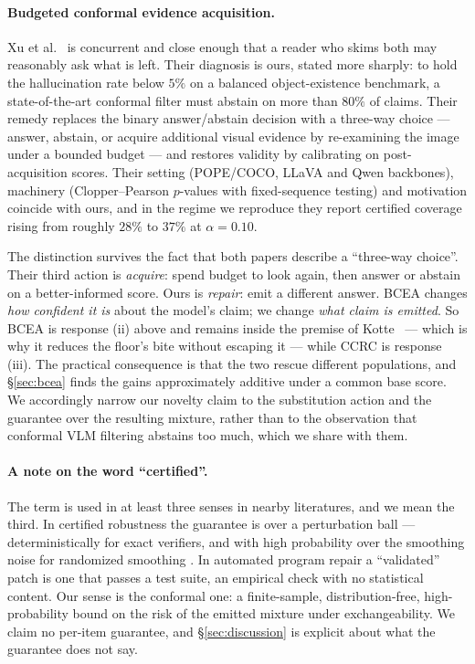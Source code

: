 \documentclass[review,number,doubleblind]{elsarticle}
\theoremstyle{plain}
\theoremstyle{definition}
\theoremstyle{remark}
\begin{document}
\paragraph{Budgeted conformal evidence acquisition.}
Xu et al.~\cite{bcea} is concurrent and close enough that a reader who skims both may reasonably ask
what is left. Their diagnosis is ours, stated more sharply: to hold the hallucination rate
below $5\%$ on a balanced object-existence benchmark, a state-of-the-art conformal filter must
abstain on more than $80\%$ of claims. Their remedy replaces the binary answer/abstain decision
with a three-way choice --- answer, abstain, or acquire additional visual evidence by
re-examining the image under a bounded budget --- and restores validity by calibrating on
post-acquisition scores. Their setting (POPE/COCO, LLaVA and Qwen backbones), machinery
(Clopper--Pearson $p$-values with fixed-sequence testing) and motivation coincide with ours,
and in the regime we reproduce they report certified coverage rising from roughly $28\%$ to
$37\%$ at $\alpha=0.10$.

The distinction survives the fact that both papers describe a ``three-way choice''. Their third
action is \emph{acquire}: spend budget to look again, then answer or abstain on a better-informed
score. Ours is \emph{repair}: emit a different answer. BCEA changes \emph{how confident it is}
about the model's claim; we change \emph{what claim is emitted}. So BCEA is response (ii) above
and remains inside the premise of Kotte~\cite{crcimposs} --- which is why it reduces the floor's bite
without escaping it --- while CCRC is response (iii). The practical consequence is that the two
rescue different populations, and \S\ref{sec:bcea} finds the gains approximately additive under
a common base score. We accordingly narrow our novelty claim to the substitution action and the
guarantee over the resulting mixture, rather than to the observation that conformal VLM
filtering abstains too much, which we share with them.

\paragraph{A note on the word ``certified''.}
The term is used in at least three senses in nearby literatures, and we mean the third.
In certified robustness the guarantee is over a perturbation ball --- deterministically for
exact verifiers, and with high probability over the smoothing noise for randomized smoothing
\citep{cohen2019}. In automated program repair \citep{legoues2019} a ``validated'' patch is one
that passes a test suite, an empirical check with no statistical content. Our sense is the
conformal one: a finite-sample, distribution-free, high-probability bound on the risk of the
emitted mixture under exchangeability. We claim no per-item guarantee, and
\S\ref{sec:discussion} is explicit about what the guarantee does not say.
\end{document}
